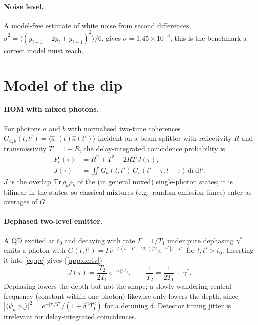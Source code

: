 \documentclass{article}
\newcommand{\dd}{\mathrm{d}}
\begin{document}
\paragraph{Noise level.} A model-free estimate of white noise from second
differences, $\hat\sigma^2 = \langle(y_{i+1}-2y_i+y_{i-1})^2\rangle/6$, gives
$\hat\sigma=1.45\times10^{-3}$; this is the benchmark a correct model must
reach.

\section{Model of the dip}
\label{sec:model}

\paragraph{HOM with mixed photons.} For photons $a$ and $b$ with normalised
two-time coherences $G_{a,b}(t,t')=\langle \hat a^\dagger(t)\hat a(t')\rangle$
incident on a beam splitter with reflectivity $R$ and transmissivity $T=1-R$,
the delay-integrated coincidence probability is
\cite{Bylander2003,Kiraz2004,Branczyk2017}
\begin{align}
  P_c(\tau) &= R^2+T^2 - 2RT\,J(\tau), \label{eq:pc}\\
  J(\tau) &= \iint G_a(t,t')\,G_b(t'\!-\!\tau,t\!-\!\tau)\,\dd t\,\dd t'. \nonumber
\end{align}
$J$ is the overlap $\mathrm{Tr}\,\rho_a\rho_b$ of the (in general mixed)
single-photon states; it is bilinear in the states, so classical mixtures
(e.g.\ random emission times) enter as averages of $G$.

\paragraph{Dephased two-level emitter.} A QD excited at $t_0$ and
decaying with rate $\Gamma=1/T_1$ under pure dephasing $\gamma^*$ emits a
photon with
$G(t,t') = \Gamma e^{-\Gamma(t+t'-2t_0)/2}\,e^{-\gamma^*|t-t'|}$ for
$t,t'>t_0$. Inserting it into \cref{eq:pc} gives (\cref{app:deriv})
\begin{equation}
  J(\tau) = \frac{T_2}{2T_1}\,e^{-|\tau|/T_1},\qquad
  \frac{1}{T_2}=\frac{1}{2T_1}+\gamma^* .
  \label{eq:exp}
\end{equation}
Dephasing lowers the depth but not the shape; a slowly wandering central
frequency (constant within one photon) likewise only lowers the depth, since
$|\langle\psi_a|\psi_b\rangle|^2 = e^{-|\tau|/T_1}/(1+\delta^2T_1^2)$ for a
detuning $\delta$. Detector timing jitter is irrelevant for
delay-integrated coincidences.
\end{document}
